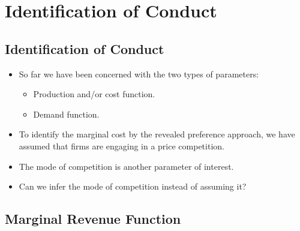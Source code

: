 \documentclass[]{book}
\providecommand{\tightlist}{%
  \setlength{\itemsep}{0pt}\setlength{\parskip}{0pt}}
\begin{document}
\section{Identification of Conduct}\label{identification-of-conduct}

\subsection{Identification of
Conduct}\label{identification-of-conduct-1}

\begin{itemize}
\tightlist
\item
  So far we have been concerned with the two types of parameters:

  \begin{itemize}
  \tightlist
  \item
    Production and/or cost function.
  \item
    Demand function.
  \end{itemize}
\item
  To identify the marginal cost by the revealed preference approach, we
  have assumed that firms are engaging in a price competition.
\item
  The mode of competition is another parameter of interest.
\item
  Can we infer the mode of competition instead of assuming it?
\end{itemize}

\subsection{Marginal Revenue Function}\label{marginal-revenue-function}
\end{document}
